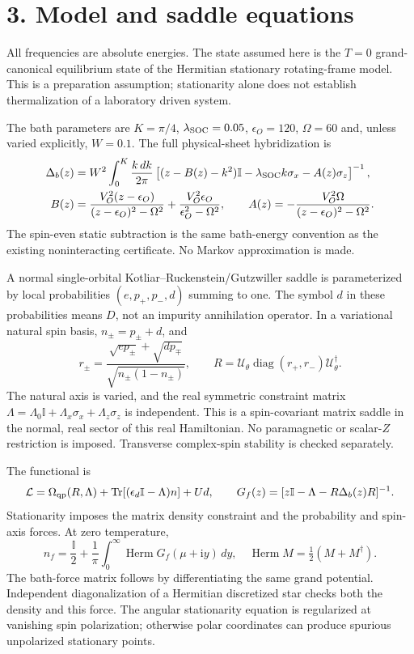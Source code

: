 \documentclass[11pt]{article}
\newcommand{\Tr}{\operatorname{Tr}}
\newcommand{\ii}{\mathrm{i}}
\newcommand{\Id}{\mathbb I}
\begin{document}
\newpage
\section*{3. Model and saddle equations}
All frequencies are absolute energies. The state assumed here is the
$T=0$ grand-canonical equilibrium state of the Hermitian stationary
rotating-frame model. This is a preparation assumption; stationarity alone
does not establish thermalization of a laboratory driven system.

The bath parameters are $K=\pi/4$, $\lambda_{\rm SOC}=0.05$,
$\epsilon_O=120$, $\Omega=60$ and, unless varied explicitly, $W=0.1$.
The full physical-sheet hybridization is
\begin{align}
\Delta_b(z)&=W^2\int_0^K\frac{k\,dk}{2\pi}
\left[(z-B(z)-k^2)\Id-\lambda_{\rm SOC}k\sigma_x-A(z)\sigma_z\right]^{-1},\\
B(z)&=\frac{V_O^2(z-\epsilon_O)}{(z-\epsilon_O)^2-\Omega^2}
+\frac{V_O^2\epsilon_O}{\epsilon_O^2-\Omega^2},\qquad
A(z)=-\frac{V_O^2\Omega}{(z-\epsilon_O)^2-\Omega^2}.
\end{align}
The spin-even static subtraction is the same bath-energy convention as the
existing noninteracting certificate. No Markov approximation is made.

A normal single-orbital Kotliar--Ruckenstein/Gutzwiller saddle is parameterized
by local probabilities $(e,p_+,p_-,d)$ summing to one. The symbol $d$ in these
probabilities means $D$, not an impurity annihilation operator. In a variational
natural spin basis, $n_\pm=p_\pm+d$, and
\begin{equation}
r_\pm=\frac{\sqrt{e p_\pm}+\sqrt{d p_\mp}}
{\sqrt{n_\pm(1-n_\pm)}},\qquad
R=\mathcal U_\theta\operatorname{diag}(r_+,r_-)\mathcal U_\theta^\dagger.
\end{equation}
The natural axis is varied, and the real symmetric constraint matrix
$\Lambda=\Lambda_0\Id+\Lambda_x\sigma_x+\Lambda_z\sigma_z$ is independent.
This is a spin-covariant matrix saddle in the normal, real sector of this real
Hamiltonian. No paramagnetic or scalar-$Z$ restriction is imposed.
Transverse complex-spin stability is checked separately.

The functional is
\begin{equation}
\mathcal L=\Omega_{\rm qp}(R,\Lambda)
+\Tr[(\epsilon_d\Id-\Lambda)n]+Ud,\qquad
G_f(z)=[z\Id-\Lambda-R\Delta_b(z)R]^{-1}.
\end{equation}
Stationarity imposes the matrix density constraint and the probability and
spin-axis forces. At zero temperature,
\begin{equation}
n_f=\frac{\Id}{2}+\frac1\pi\int_0^\infty
\operatorname{Herm}G_f(\mu+\ii y)\,dy,
\quad \operatorname{Herm}M=\tfrac12(M+M^\dagger).
\end{equation}
The bath-force matrix follows by differentiating the same grand potential.
Independent diagonalization of a Hermitian discretized star checks both the
density and this force. The angular stationarity equation is regularized at
vanishing spin polarization; otherwise polar coordinates can produce spurious
unpolarized stationary points.
\end{document}
